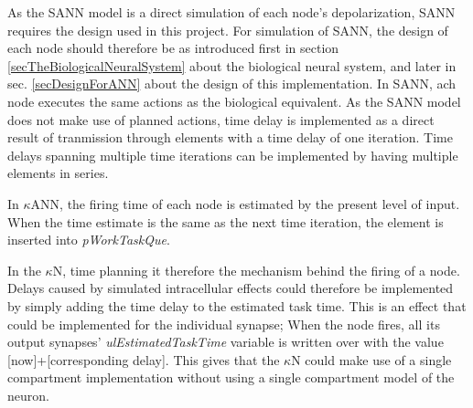 		As the SANN model is a direct simulation of each node's depolarization, SANN requires the design used in this project.
		For simulation of SANN, the design of each node should therefore be as introduced first in section \ref{secTheBiologicalNeuralSystem} about the biological neural system, 
			and later in sec. \ref{secDesignForANN} about the design of this implementation.
		In SANN, ach node executes the same actions as the biological equivalent.
		As the SANN model does not make use of planned actions, time delay is implemented as a direct result of tranmission through elements with a time delay of one iteration.
		Time delays spanning multiple time iterations can be implemented by having multiple elements in series.


		In $\kappa$ANN, the firing time of each node is estimated by the present level of input. 
		When the time estimate is the same as the next time iteration, the element is inserted into \emph{pWorkTaskQue}.
		
		In the $\kappa$N, time planning it therefore the mechanism behind the firing of a node.
		Delays caused by simulated intracellular effects could therefore be implemented by simply adding the time delay to the estimated task time.
		This is an effect that could be implemented for the individual synapse;
			When the node fires, all its output synapses' \emph{ulEstimatedTaskTime} variable is written over with the value [now]+[corresponding delay].
		This gives that the $\kappa$N could make use of a single compartment implementation without using a single compartment model of the neuron.

